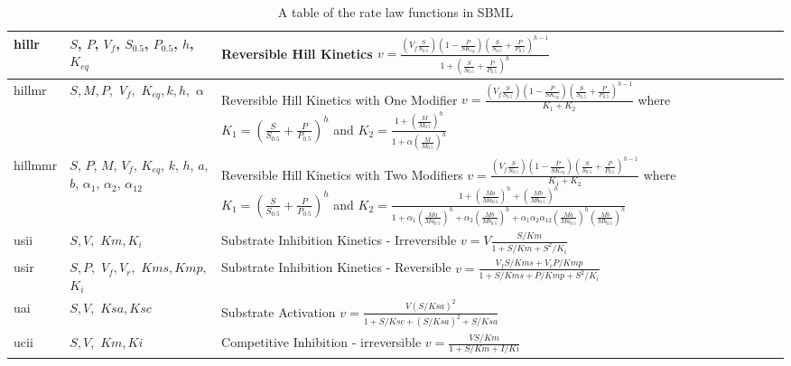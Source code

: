 \documentclass[10pt]{article}
\begin{document}
\begin{table}[h]
\begin{tabular}{|p{1cm}|p{2cm}|p{13cm}|}
hillr & $S$, $P$, $V_f$, $S_{0.5}$, $P_{0.5}$, $h$, $K_{eq}$ &
Reversible Hill Kinetics $ v = \frac{\left(V_f \frac{S}{S_{0.5}}
\right) \left(1 - \frac{P}{S K_{eq}} \right)
\left(\frac{S}{S_{0.5}} + \frac{P}{P_{0.5}}\right)^{h-1}}{1 +
\left(\frac{S}{S_{0.5}} + \frac{P}{P_{0.5}}\right)^h} $\\ \hline

hillmr & $ S, M, P, $ $ V_f, $ $ K_{eq}, k, h, $ $\alpha$ & Reversible Hill
Kinetics with One Modifier $ v = \frac{\left(V_f
\frac{S}{S_{0.5}} \right) \left(1 - \frac{P}{S K_{eq}} \right)
\left(\frac{S}{S_{0.5}} + \frac{P}{P_{0.5}}\right)^{h-1}} {K_1 +
K_2} $ \newline where $ K_1 = \left(\frac{S}{S_{0.5}} +
\frac{P}{P_{0.5}}\right)^h $
\newline  and $ K_2 = \frac{1 + \left(\frac{M}{M_{0.5}}\right)^h}{1
+ \alpha \left(\frac{M}{M_{0.5}}\right)^h} $    \\ \hline

hillmmr & $S$, $P$, $M$, $V_f$, $K_{eq}$, $k$, $h$, $a$, $b$, $\alpha_1$, $\alpha_2$, $\alpha_{12}$ &
Reversible Hill Kinetics with Two Modifiers $ v = \frac{\left(V_f
\frac{S}{S_{0.5}} \right) \left(1 - \frac{P}{S K_{eq}} \right)
\left(\frac{S}{S_{0.5}} + \frac{P}{P_{0.5}}\right)^{h-1}} {K_1 +
K_2} $ where $ K_1 = \left(\frac{S}{S_{0.5}} +
\frac{P}{P_{0.5}}\right)^h $ and $ K_2 = \frac{1 +
\left(\frac{Ma}{Ma_{0.5}}\right)^h + \left( \frac{Mb}{Mb_{0.5}}
\right)^h } {1 + \alpha_1 \left(\frac{Ma}{Ma_{0.5}}\right)^h +
\alpha_2 \left(\frac{Mb}{Mb_{0.5}}\right)^h + \alpha_1 \alpha_2
\alpha_{12} \left( \frac{Ma}{Ma_{0.5}} \right)^h \left(
\frac{Mb}{Mb_{0.5}} \right)^h}  $ \\ \hline

usii & $ S, V, $ $ Km, K_i $ & Substrate Inhibition Kinetics -
Irreversible $ v = V \frac{S/Km}{1 + S/Km + S^2/K_i} $ \\ \hline

usir & $ S, P, $ $ V_f, V_r, $ $ Kms, Kmp, $ $K_i $ & Substrate
Inhibition Kinetics - Reversible $ v = \frac{V_f S/Kms + V_r
P/Kmp}{1 + S/Kms + P/Kmp + S^2/K_i} $
\\ \hline

uai & $ S, V, $ $ Ksa, Ksc $ & Substrate Activation $ v =
\frac{V \left( S/Ksa \right)^2}{1 + S/Ksc + \left( S/Ksa\right)^2
+ S/Ksa} $ \\ \hline

ucii & $ S, V, $ $ Km, Ki $ & Competitive Inhibition -
irreversible $ v = \frac{V S/Km}{1 + S/Km + I/Ki} $
\\ \hline

\end{tabular}
\caption{A table of the rate law functions in SBML}
\label{tab:ratelaws}
\end{table}
\end{document}
